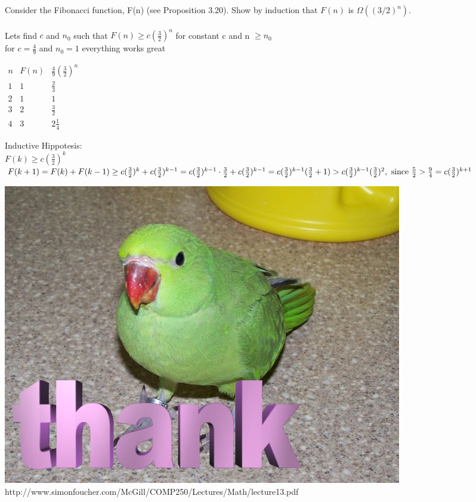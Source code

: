 \documentclass{article}
\begin{document}
Consider the Fibonacci function, F(n) (see Proposition 3.20). Show by
induction that $F(n)$ is $\Omega((3/2)^n)$.\\\\

Lets find $c$ and $n_{0}$ such that $F(n) \geq c(\frac{3}{2})^{n}$ for constant c and n $\geq n_0$\\
for $c = \frac{4}{9}$ and $n_{0} = 1$ everything works great\\
\begin{center}
	$
	\begin{array}{ccc}
	n	& F(n) & \frac{4}{9} (\frac{3}{2})^n \\ 
	1	& 1 & \frac{2}{3} \\ 
	2	& 1 & 1 \\ 
	3	& 2 & \frac{3}{2} \\
	4	& 3 & 2\frac{1}{4}
	\end{array} 
	$
\end{center}
Inductive Hippotesis:\\
$F(k) \geq c(\frac{3}{2})^{k}$\\

\begin{math}
F(k+1) = F(k) + F(k-1)\\
\geq c(\frac{3}{2})^{k} + c(\frac{3}{2})^{k-1}\\
= c(\frac{3}{2})^{k-1}\cdot\frac{3}{2} + c(\frac{3}{2})^{k-1}\\
= c(\frac{3}{2})^{k-1}(\frac{3}{2}+1)\\
> c(\frac{3}{2})^{k-1}(\frac{3}{2})^{2}, \textnormal{ since } \frac{5}{2} > \frac{9}{4} \\
= c(\frac{3}{2})^{k+1}
\end{math}

\begin{center}
	\includegraphics[scale=0.3]{birb}
	http://www.simonfoucher.com/McGill/COMP250/Lectures/Math/lecture13.pdf
\end{center}

	
\end{document}
